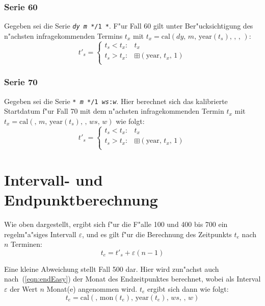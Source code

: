 \documentclass[a4paper]{article}
\newcommand*{\monf}{\mathrm{mon}}
\newcommand*{\yearf}{\mathrm{year}}
\newcommand*{\calf}{\mathrm{cal}}
\newcommand*{\addff}{\boxplus}
\numberwithin{equation}{section}
\begin{document}
\subsubsection{Serie 60}
Gegeben sei die Serie \texttt{\textit{dy} \textit{m} */1 *}. F"ur Fall 60 gilt
unter Ber"ucksichtigung des n"achsten infragekommenden Termins $t_x$ mit
$t_x = \calf(dy,\,m,\,\yearf(t_s),\,,\,,\,)$:
\begin{equation}
  t'_s = \left\{\begin{array}{ll}
    t_s < t_x : & t_x \\
    t_s > t_x : & \addff(\yearf,\,t_x,\,1) \\
  \end{array}\right.
\end{equation}

\subsubsection{Serie 70}
Gegeben sei die Serie \texttt{* \textit{m} */1 \textit{ws}:\textit{w}}. Hier
berechnet sich das kalibrierte Startdatum f"ur Fall 70 mit dem n"achsten
infragekommenden Termin $t_x$ mit $t_x = \calf(,\,m,\,\yearf(t_s),\,,\,ws,\,w)$
wie folgt:
\begin{equation}
  t'_s = \left\{\begin{array}{ll}
    t_s < t_x : & t_x \\
    t_s > t_x : & \addff(\yearf,\,t_x,\,1) \\
  \end{array}\right.
\end{equation}



%
%
%
%
\section{Intervall- und Endpunktberechnung}
\noindent Wie oben dargestellt, ergibt sich f"ur die F"alle 100 und 400 bis 700
ein regelm"a"siges Intervall $\varepsilon$, und es gilt f"ur die Berechnung des
Zeitpunkts $t_e$ nach $n$ Terminen:
\begin{equation}\label{eqn:endEasy}
  t_e = t'_s + \varepsilon(n - 1)
\end{equation}

\noindent Eine kleine Abweichung stellt Fall 500 dar. Hier wird zun"achst auch
nach~(\ref{eqn:endEasy}) der Monat des Endzeitpunktes berechnet, wobei als
Interval $\varepsilon$ der Wert $n$ Monat(e) angenommen wird. $t_e$ ergibt sich
dann wie folgt:
\begin{equation}t_e = \calf(,\,\monf(t_e),\,\yearf(t_e),\,ws,\,,\,w)\end{equation}
\end{document}
